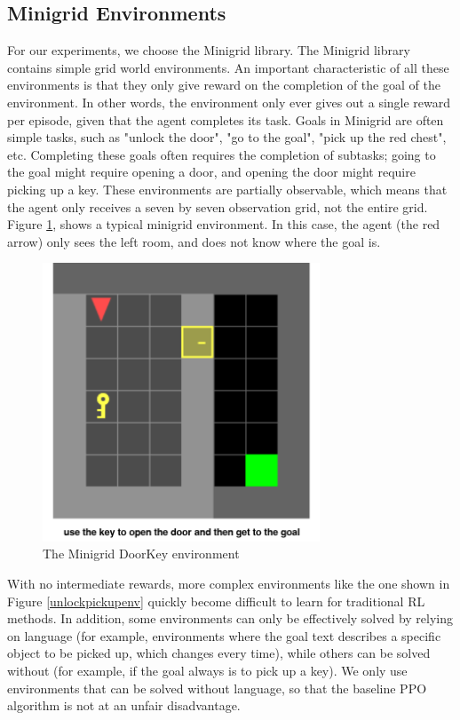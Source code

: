 \documentclass[conference]{IEEEtran}
\begin{document}
\subsection{Minigrid Environments}

For our experiments, we choose the Minigrid library. The Minigrid library contains simple grid world environments. An important characteristic of all these environments is that they only give reward on the completion of the goal of the environment. In other words, the environment only ever gives out a single reward per episode, given that the agent completes its task. Goals in Minigrid are often simple tasks, such as "unlock the door", "go to the goal", "pick up the red chest", etc. Completing these goals often requires the completion of subtasks; going to the goal might require opening a door, and opening the door might require picking up a key. These environments are partially observable, which means that the agent only receives a seven by seven observation grid, not the entire grid. Figure \ref{doorkeyenv}, shows a typical minigrid environment. In this case, the agent (the red arrow) only sees the left room, and does not know where the goal is. 

\begin{figure}[h]
\centerline{\includegraphics[width=3.25in]{figure/doorkeyenv.png}}
\caption{The Minigrid DoorKey environment}
\label{doorkeyenv}
\end{figure}


With no intermediate rewards, more complex environments like the one shown in Figure \ref{unlockpickupenv} quickly become difficult to learn for traditional RL methods. In addition, some environments can only be effectively solved by relying on language (for example, environments where the goal text describes a specific object to be picked up, which changes every time), while others can be solved without (for example, if the goal always is to pick up a key). We only use environments that can be solved without language, so that the baseline PPO algorithm is not at an unfair disadvantage.
\end{document}
